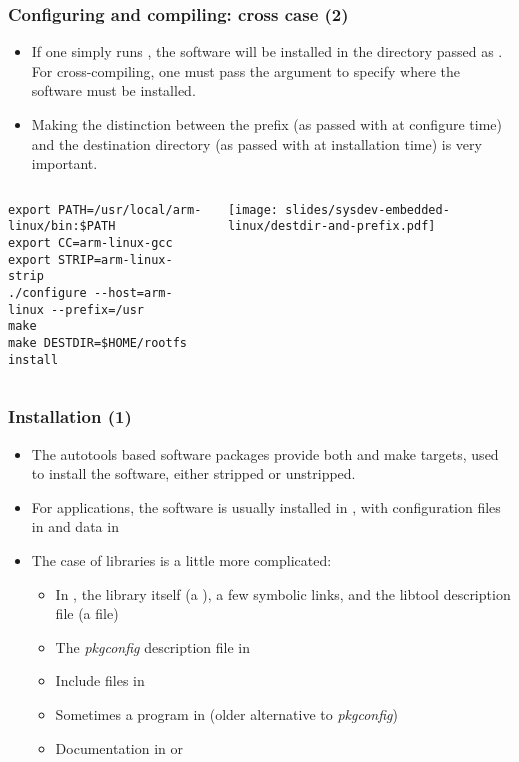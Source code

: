 \begin{frame}[fragile]
  \frametitle{Configuring and compiling: cross case (2)}
  \begin{itemize}
  \item If one simply runs , the software will be
    installed in the directory passed as . For
    cross-compiling, one must pass the  argument to
    specify where the software must be installed.
  \item Making the distinction between the prefix (as passed with
     at configure time) and the destination directory (as
    passed with  at installation time) is very important.
  \end{itemize}
  \begin{columns}
\footnotesize
\begin{block}{}
\begin{verbatim}
export PATH=/usr/local/arm-linux/bin:$PATH
export CC=arm-linux-gcc
export STRIP=arm-linux-strip
./configure --host=arm-linux --prefix=/usr
make
make DESTDIR=$HOME/rootfs install
\end{verbatim}
\end{block}
    \texttt{[image: slides/sysdev-embedded-linux/destdir-and-prefix.pdf]}
  \end{columns}
\end{frame}

\begin{frame}
  \frametitle{Installation (1)}
  \begin{itemize}
  \item The autotools based software packages provide both
     and  make targets, used to
    install the software, either stripped or unstripped.
  \item For applications, the software is usually installed in
    , with configuration files in
     and data in
  \item The case of libraries is a little more complicated:
    \begin{itemize}
    \item In , the library itself (a
      ), a few symbolic links, and
      the libtool description file (a  file)
    \item The {\em pkgconfig} description file in
    \item Include files in 
    \item Sometimes a  program in
       (older alternative to {\em pkgconfig})
    \item Documentation in  or
    \end{itemize}
  \end{itemize}
\end{frame}

